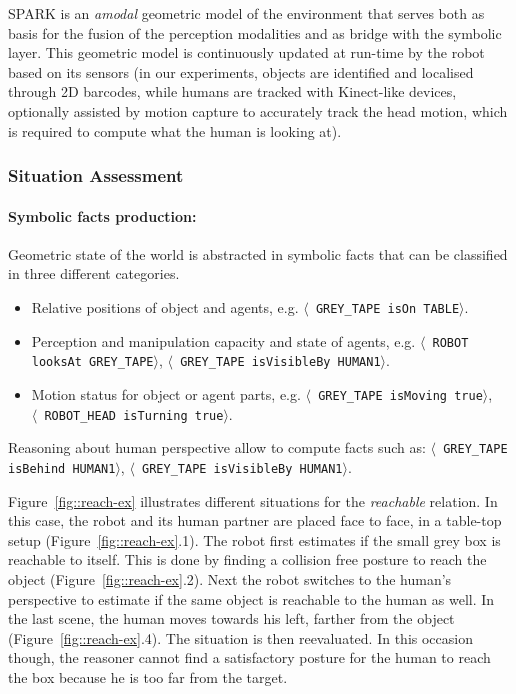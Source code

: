 \documentclass[preprint,12pt]{elsarticle}
\newcommand{\stmt}[1]{{\footnotesize \tt $\langle$ #1\relax$\rangle$}}
\begin{document}
SPARK is an \emph{amodal} geometric model of the environment that serves both
as basis for the fusion of the perception modalities and as bridge with the
symbolic layer. This geometric model is continuously updated at run-time by the
robot based on its sensors (in our experiments, objects are identified and
localised through 2D barcodes, while humans are tracked with Kinect-like
devices, optionally assisted by motion capture to accurately track the head
motion, which is required to compute what the human is looking at).


\subsubsection{Situation Assessment}

\paragraph{Symbolic facts production:} 

Geometric state of the world is abstracted in symbolic facts that can
be classified in three different categories.

\begin {itemize}
\item Relative positions of object and agents, e.g.  \stmt{GREY\_TAPE
    isOn TABLE}.

\item Perception and manipulation capacity and state of agents,
  e.g. \stmt{ROBOT looksAt GREY\_TAPE}, \stmt{GREY\_TAPE isVisibleBy
    HUMAN1}.

\item Motion status for object or agent parts, e.g.  \stmt{GREY\_TAPE
    isMoving true},\\ \stmt{ROBOT\_HEAD isTurning true}.
\end {itemize} 

Reasoning about human perspective allow to compute facts such as:
\stmt{GREY\_TAPE isBehind HUMAN1}, \stmt{GREY\_TAPE isVisibleBy
  HUMAN1}.

Figure~\ref{fig::reach-ex} illustrates different situations for the
\textit{reachable} relation. In this case, the robot and its human partner
are placed face to face, in a table-top setup (Figure~\ref{fig::reach-ex}.1).
The robot first estimates if the small grey box is reachable to itself. This is
done by finding a collision free posture to reach the object
(Figure~\ref{fig::reach-ex}.2). Next the robot switches to the human's
perspective to estimate if the same object is reachable to the human as well.
In the last scene, the human moves towards his left, farther from the object
(Figure~\ref{fig::reach-ex}.4). The situation is then reevaluated. In this
occasion though, the reasoner cannot find a satisfactory posture for the human
to reach the box because he is too far from the target.
\end{document}
